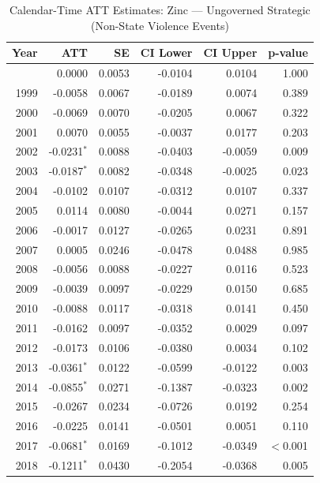 \begin{longtable}{rrrrrr}
\caption{Calendar-Time ATT Estimates: Zinc --- Ungoverned Strategic (Non-State Violence Events)} \label{tab:cal_zinc} \\
\toprule
\textbf{Year} & \textbf{ATT} & \textbf{SE} & \textbf{CI Lower} & \textbf{CI Upper} & \textbf{p-value} \\
\midrule
\endfirsthead
\bottomrule
\endlastfoot
1998 & 0.0000 & 0.0053 & -0.0104 & 0.0104 & 1.000 \\
1999 & -0.0058 & 0.0067 & -0.0189 & 0.0074 & 0.389 \\
2000 & -0.0069 & 0.0070 & -0.0205 & 0.0067 & 0.322 \\
2001 & 0.0070 & 0.0055 & -0.0037 & 0.0177 & 0.203 \\
2002 & -0.0231$^{*}$ & 0.0088 & -0.0403 & -0.0059 & 0.009 \\
2003 & -0.0187$^{*}$ & 0.0082 & -0.0348 & -0.0025 & 0.023 \\
2004 & -0.0102 & 0.0107 & -0.0312 & 0.0107 & 0.337 \\
2005 & 0.0114 & 0.0080 & -0.0044 & 0.0271 & 0.157 \\
2006 & -0.0017 & 0.0127 & -0.0265 & 0.0231 & 0.891 \\
2007 & 0.0005 & 0.0246 & -0.0478 & 0.0488 & 0.985 \\
2008 & -0.0056 & 0.0088 & -0.0227 & 0.0116 & 0.523 \\
2009 & -0.0039 & 0.0097 & -0.0229 & 0.0150 & 0.685 \\
2010 & -0.0088 & 0.0117 & -0.0318 & 0.0141 & 0.450 \\
2011 & -0.0162 & 0.0097 & -0.0352 & 0.0029 & 0.097 \\
2012 & -0.0173 & 0.0106 & -0.0380 & 0.0034 & 0.102 \\
2013 & -0.0361$^{*}$ & 0.0122 & -0.0599 & -0.0122 & 0.003 \\
2014 & -0.0855$^{*}$ & 0.0271 & -0.1387 & -0.0323 & 0.002 \\
2015 & -0.0267 & 0.0234 & -0.0726 & 0.0192 & 0.254 \\
2016 & -0.0225 & 0.0141 & -0.0501 & 0.0051 & 0.110 \\
2017 & -0.0681$^{*}$ & 0.0169 & -0.1012 & -0.0349 & $<$0.001 \\
2018 & -0.1211$^{*}$ & 0.0430 & -0.2054 & -0.0368 & 0.005 \\
\end{longtable}
